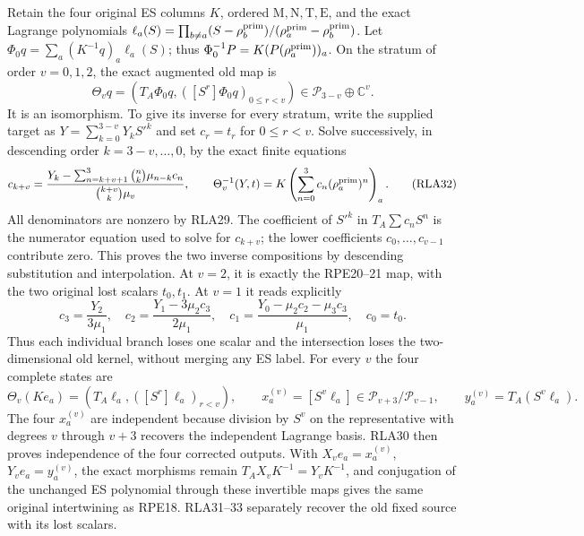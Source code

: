 \documentclass[11pt]{article}
\begin{document}
Retain the four original ES columns $K$, ordered
$\mathrm M,\mathrm N,\mathrm T,\mathrm E$, and the exact Lagrange
polynomials
$\ell_a(S)=\prod_{b\ne a}(S-\rho_b^{\rm prim})/
(\rho_a^{\rm prim}-\rho_b^{\rm prim})$.
Let $\Phi_0q=\sum_a(K^{-1}q)_a\ell_a(S)$; thus
$\Phi_0^{-1}P=K(P(\rho_a^{\rm prim}))_a$.
On the stratum of order $v=0,1,2$, the exact augmented old map is
\[
 \Theta_vq=\left(T_A\Phi_0q,
          ([S^r]\Phi_0q)_{0\le r<v}\right)
   \in\mathcal P_{3-v}\oplus\mathbb C^v.
 \tag{RLA31}
\]
It is an isomorphism.  To give its inverse for every stratum,
write the supplied target as $Y=\sum_{k=0}^{3-v}Y_kS'^k$ and
set $c_r=t_r$ for $0\le r<v$.  Solve successively, in descending
order $k=3-v,\ldots,0$, by the exact finite equations
\[
 c_{k+v}=\frac{Y_k-
       \sum_{n=k+v+1}^3\binom nk\mu_{n-k}c_n}
                   {\binom{k+v}{k}\mu_v},\qquad
 \Theta_v^{-1}(Y,t)=K\left(\sum_{n=0}^3c_n
                                    (\rho_a^{\rm prim})^n\right)_a.
 \tag{RLA32}
\]
All denominators are nonzero by RLA29.
The coefficient of $S'^k$ in $T_A\sum c_nS^n$ is the numerator
equation used to solve for $c_{k+v}$; the lower coefficients
$c_0,\ldots,c_{v-1}$ contribute zero.  This proves the two inverse
compositions by descending substitution and interpolation.
At $v=2$, it is exactly the RPE20--21 map, with the two original
lost scalars $t_0,t_1$.  At $v=1$ it reads explicitly
\[
 c_3=\frac{Y_2}{3\mu_1},\quad
 c_2=\frac{Y_1-3\mu_2c_3}{2\mu_1},\quad
 c_1=\frac{Y_0-\mu_2c_2-\mu_3c_3}{\mu_1},\quad c_0=t_0.
 \tag{RLA33}
\]
Thus each individual branch loses one scalar and the intersection
loses the two-dimensional old kernel, without merging any ES label.
For every $v$ the four complete states are
\[
 \Theta_v(Ke_a)=
 \left(T_A\ell_a,([S^r]\ell_a)_{r<v}\right),\qquad
 x_a^{(v)}=[S^v\ell_a]\in\mathcal P_{v+3}/\mathcal P_{v-1},\qquad
 y_a^{(v)}=T_A(S^v\ell_a).
 \tag{RLA34}
\]
The four $x_a^{(v)}$ are independent because division by $S^v$
on the representative with degrees $v$ through $v+3$ recovers
the independent Lagrange basis.  RLA30 then proves independence
of the four corrected outputs.  With $X_ve_a=x_a^{(v)}$,
$Y_ve_a=y_a^{(v)}$, the exact morphisms remain
$T_AX_vK^{-1}=Y_vK^{-1}$, and conjugation of the unchanged ES
polynomial through these invertible maps gives the same original
intertwining as RPE18.  RLA31--33 separately recover the old
fixed source with its lost scalars.
\end{document}
